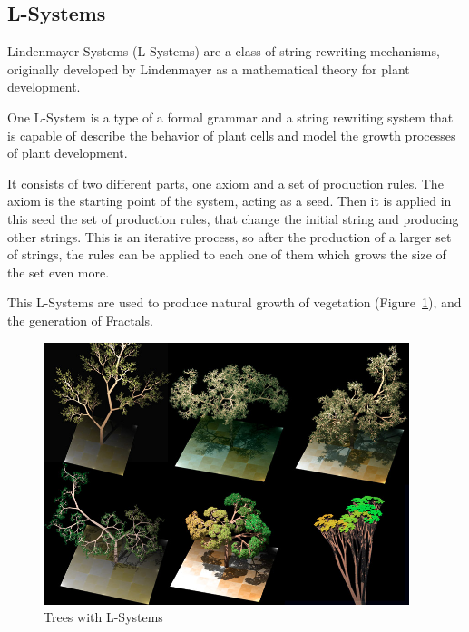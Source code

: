 
\subsection{L-Systems} %
\label{ssub:l_systems}

Lindenmayer Systems (L-Systems) are a class of string rewriting mechanisms, originally developed by Lindenmayer as a mathematical theory for plant development.

One L-System is a type of a formal grammar and a string rewriting system that is capable of describe the behavior of plant cells and model the growth processes of plant development.

It consists of two different parts, one axiom and a set of production rules. The axiom is the starting point of the system, acting as a seed. Then it is applied in this seed the set of production rules, that change the initial string and producing other strings.
This is an iterative process, so after the production of a larger set of strings, the rules can be applied to each one of them which grows the size of the set even more.

This L-Systems are used to produce natural growth of vegetation (Figure~\ref{fig:trees}), and the generation of Fractals. 


\begin{figure}[htbp]
    \centering
    \includegraphics[width=0.95\textwidth]{img/Theory/L_Systems/Dragon_trees.jpg}
    \caption{Trees with L-Systems}
    \label{fig:trees}
\end{figure}


